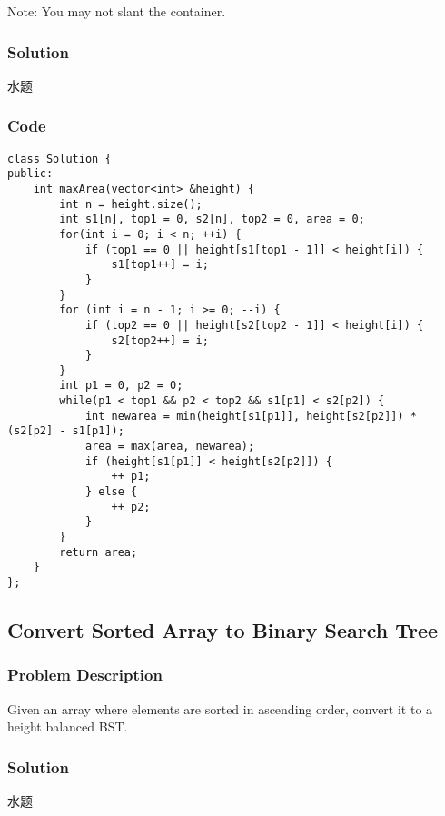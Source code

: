 \documentclass[courier]{article}
\begin{document}
\begin{CJK*}{UTF8}{gkai}
Note: You may not slant the container.



\subsubsection*{Solution}
水题

\subsubsection*{Code}
\begin{lstlisting}
class Solution {
public:
    int maxArea(vector<int> &height) {
        int n = height.size();
        int s1[n], top1 = 0, s2[n], top2 = 0, area = 0;
        for(int i = 0; i < n; ++i) {
            if (top1 == 0 || height[s1[top1 - 1]] < height[i]) {
                s1[top1++] = i;
            }
        }
        for (int i = n - 1; i >= 0; --i) {
            if (top2 == 0 || height[s2[top2 - 1]] < height[i]) {
                s2[top2++] = i;
            }
        }
        int p1 = 0, p2 = 0;
        while(p1 < top1 && p2 < top2 && s1[p1] < s2[p2]) {
            int newarea = min(height[s1[p1]], height[s2[p2]]) * (s2[p2] - s1[p1]);
            area = max(area, newarea);
            if (height[s1[p1]] < height[s2[p2]]) {
                ++ p1;
            } else {
                ++ p2;
            }
        }
        return area;
    }
}; 
\end{lstlisting}


\subsection{ Convert Sorted Array to Binary Search Tree }

\subsubsection*{Problem Description}
Given an array where elements are sorted in ascending order, convert it to a height balanced BST.



\subsubsection*{Solution}
水题


\end{CJK*}
\end{document}
